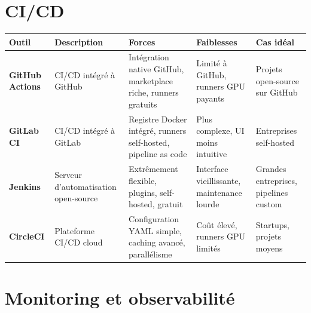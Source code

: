 \section{CI/CD}
\label{app:cicd}

\begin{center}
\small
\begin{tabular}{@{}p{2cm}p{2.8cm}p{3cm}p{3cm}p{2cm}@{}}
\toprule
\textbf{Outil} & \textbf{Description} & \textbf{Forces} &
  \textbf{Faiblesses} & \textbf{Cas id\'eal} \\
\midrule
\textbf{GitHub Actions} & CI/CD int\'egr\'e \`a GitHub &
  Int\'egration native GitHub, marketplace riche, runners gratuits &
  Limit\'e \`a GitHub, runners GPU payants &
  Projets open-source sur GitHub \\
\addlinespace
\textbf{GitLab CI} & CI/CD int\'egr\'e \`a GitLab &
  Registre Docker int\'egr\'e, runners self-hosted, pipeline as code &
  Plus complexe, UI moins intuitive &
  Entreprises self-hosted \\
\addlinespace
\textbf{Jenkins} & Serveur d'automatisation open-source &
  Extr\^emement flexible, plugins, self-hosted, gratuit &
  Interface vieillissante, maintenance lourde &
  Grandes entreprises, pipelines custom \\
\addlinespace
\textbf{CircleCI} & Plateforme CI/CD cloud &
  Configuration YAML simple, caching avanc\'e, parall\'elisme &
  Co\^ut \'elev\'e, runners GPU limit\'es &
  Startups, projets moyens \\
\bottomrule
\end{tabular}
\end{center}

\section{Monitoring et observabilit\'e}
\label{app:monitoring}

